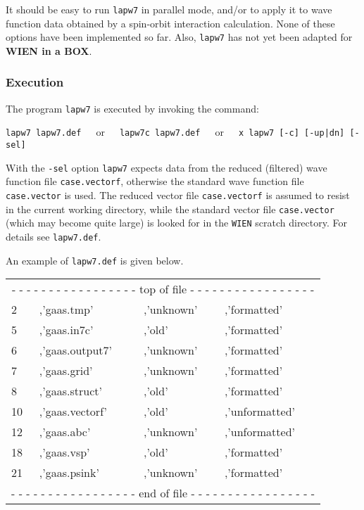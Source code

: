 \documentclass[10pt,fleqn,a4paper,twosided]{article}
\begin{document}
It should be easy to run {\tt lapw7} in parallel mode, and/or to apply it to
wave function data obtained by a spin-orbit interaction calculation.
None of these options have been implemented so far.
Also, {\tt lapw7} has not yet been adapted for {\bf WIEN in a BOX}.


\subsubsection{Execution}

The program {\tt lapw7} is executed by invoking the command:

\vspace*{.25cm}
\hspace*{1.cm}
{\tt lapw7 lapw7.def}\ \ \ or\ \ \ {\tt lapw7c lapw7.def}\ \ \ or\ \ \ 
{\tt x lapw7 [-c] [-up|dn] [-sel]}

\vspace*{.25cm}
With the {\tt -sel} option {\tt lapw7} expects data from the reduced (filtered) 
wave function file {\tt case.vectorf}, otherwise the standard wave function file
{\tt case.vector} is used. The reduced vector file {\tt case.vectorf} is
assumed to resist in the current working directory, while the standard 
vector file {\tt case.vector} (which may become quite large) is looked for in
the {\tt WIEN} scratch directory. For details see {\tt lapw7.def}.

An example of {\tt lapw7.def} is given below.

\vspace*{.25cm}
{\tt \begin{tabular}{llll}
\multicolumn{4}{c}{
- - - - - - - - - - - - - - - - - top of file - - - - - - - - - - - - - - - - -}\\[-.0ex]
2  & ,'gaas.tmp'     & ,'unknown' & ,'formatted'   \\[-.0ex]
5  & ,'gaas.in7c'    & ,'old'     & ,'formatted'   \\[-.0ex]
6  & ,'gaas.output7' & ,'unknown' & ,'formatted'   \\[-.0ex]
7  & ,'gaas.grid'    & ,'unknown' & ,'formatted'   \\[-.0ex]
8  & ,'gaas.struct'  & ,'old'     & ,'formatted'   \\[-.0ex]
10 & ,'gaas.vectorf' & ,'old'     & ,'unformatted' \\[-.0ex]
12 & ,'gaas.abc'     & ,'unknown' & ,'unformatted' \\[-.0ex]
18 & ,'gaas.vsp'     & ,'old'     & ,'formatted'   \\[-.0ex]
21 & ,'gaas.psink'   & ,'unknown' & ,'formatted'   \\[-.0ex]
\multicolumn{4}{c}{
- - - - - - - - - - - - - - - - - end of file - - - - - - - - - - - - - - - - -}\\
\end{tabular}}
\end{document}
